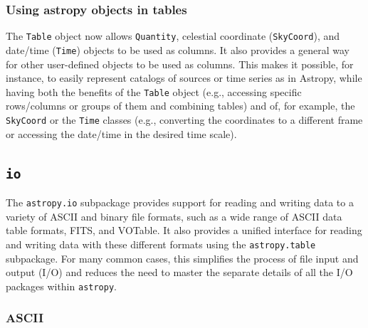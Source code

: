 \documentclass[modern]{aastex61}
\newcommand{\package}[1]{\texttt{#1}\xspace}
\newcommand{\astropy}{Astropy\xspace}
\newcommand{\astropypkg}{\package{astropy}}
\newcommand{\inlinecomment}[2]{\todo[inline]{#1: #2}\xspace}
\begin{document}
\subsubsection{Using astropy objects in tables}

The \texttt{Table} object now allows \texttt{Quantity}, celestial
coordinate (\texttt{SkyCoord}), and date/time (\texttt{Time}) objects to
be used as columns. It also provides a general way for other user-defined
objects to be used as columns. This makes it possible, for instance, to easily
represent catalogs of sources or time series as in \astropy, while having both the
benefits of the \texttt{Table} object (e.g., accessing specific rows/columns
or groups of them and combining tables) and of, for example,
the \texttt{SkyCoord} or the \texttt{Time} classes (e.g., converting the
coordinates to a different frame or accessing the date/time in the desired time scale).

\subsection{\package{io}}

The \package{astropy.io} subpackage provides support for reading and writing
data to a variety of ASCII and binary file formats, such as a wide range of
ASCII data table formats, FITS, and VOTable.
It also provides a unified interface for reading and writing data with these
different formats using the \package{astropy.table} subpackage.
For many common cases, this simplifies the process of file input and output (I/O) and
reduces the need to master the separate details of all the I/O packages within
\astropypkg.






\subsubsection{ASCII}
\end{document}
